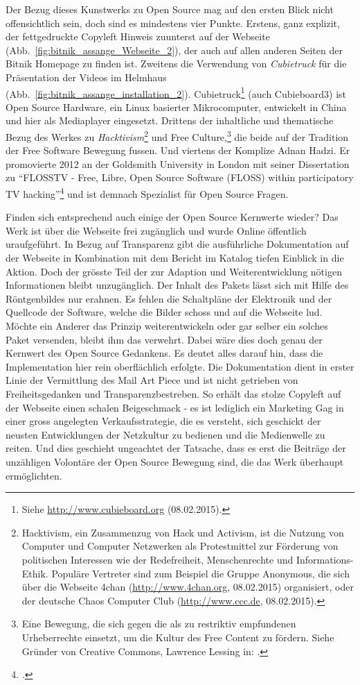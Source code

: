 \documentclass[
paper=164mm:234mm, %
pagesize, %
DIV=calc, %
10pt, %
BCOR=0mm, %
parskip=half- %
]{scrbook}
\begin{document}
Der Bezug dieses Kunstwerks zu Open Source mag auf den ersten Blick nicht offensichtlich sein, doch sind es mindestens vier Punkte. Erstens, ganz explizit, der fettgedruckte Copyleft Hinweis zuunterst auf der Webseite (Abb.~\ref{fig:bitnik_assange_Webseite_2}), der auch auf allen anderen Seiten der Bitnik Homepage zu finden ist. Zweitens die Verwendung von \emph{Cubietruck} für die Präsentation der Videos im Helmhaus (Abb.~\ref{fig:bitnik_assange_installation_2}). Cubietruck\footnote{Siehe \url{http://www.cubieboard.org} (08.02.2015).} (auch Cubieboard3) ist Open Source Hardware, ein Linux basierter Mikrocomputer, entwickelt in China und hier als Mediaplayer eingesetzt. Drittens der inhaltliche und thematische Bezug des Werkes zu \emph{Hacktivism}\footnote{Hacktivism, ein Zusammenzug von Hack und Activism, ist die Nutzung von Computer und Computer Netzwerken als Protestmittel zur Förderung von politischen Interessen wie der Redefreiheit, Menschenrechte und Informations-Ethik. Populäre Vertreter sind zum Beispiel die Gruppe Anonymous, die sich über die Webseite 4chan (\url{http://www.4chan.org}, 08.02.2015) organisiert, oder der deutsche Chaos Computer Club (\url{http://www.ccc.de}, 08.02.2015).} und Free Culture,\footnote{Eine Bewegung, die sich gegen die als zu restriktiv empfundenen Urheberrechte einsetzt, um die Kultur des Free Content zu fördern. Siehe Gründer von Creative Commons, Lawrence Lessing in: \cite[276-286]{Lessing:2004}.} die beide auf der Tradition der Free Software Bewegung fussen. Und viertens der Komplize Adnan Hadzi. Er promovierte 2012 an der Goldsmith University in London mit seiner Dissertation zu \enquote{FLOSSTV - Free, Libre, Open Source Software (FLOSS) within participatory TV hacking}\footnote{\cite{Hadzi:2012}.} und ist demnach Spezialist für Open Source Fragen.

Finden sich entsprechend auch einige der Open Source Kernwerte wieder? Das Werk ist über die Webseite frei zugänglich und wurde Online öffentlich uraufgeführt. In Bezug auf Transparenz gibt die ausführliche Dokumentation auf der Webseite in Kombination mit dem Bericht im Katalog tiefen Einblick in die Aktion. Doch der grösste Teil der zur Adaption und Weiterentwicklung nötigen Informationen bleibt unzugänglich. Der Inhalt des Pakets lässt sich mit Hilfe des Röntgenbildes nur erahnen. Es fehlen die Schaltpläne der Elektronik und der Quellcode der Software, welche die Bilder schoss und auf die Webseite lud. Möchte ein Anderer das Prinzip weiterentwickeln oder gar selber ein solches Paket versenden, bleibt ihm das verwehrt. Dabei wäre dies doch genau der Kernwert des Open Source Gedankens. Es deutet alles darauf hin, dass die Implementation hier rein oberflächlich erfolgte. Die Dokumentation dient in erster Linie der Vermittlung des Mail Art Piece und ist nicht getrieben von Freiheitsgedanken und Transparenzbestreben. So erhält das stolze Copyleft auf der Webseite einen schalen Beigeschmack - es ist lediglich ein Marketing Gag in einer gross angelegten Verkaufsstrategie, die es versteht, sich geschickt der neusten Entwicklungen der Netzkultur zu bedienen und die Medienwelle zu reiten. Und dies geschieht ungeachtet der Tatsache, dass es erst die Beiträge der unzähligen Volontäre der Open Source Bewegung sind, die das Werk überhaupt ermöglichten.
\end{document}
